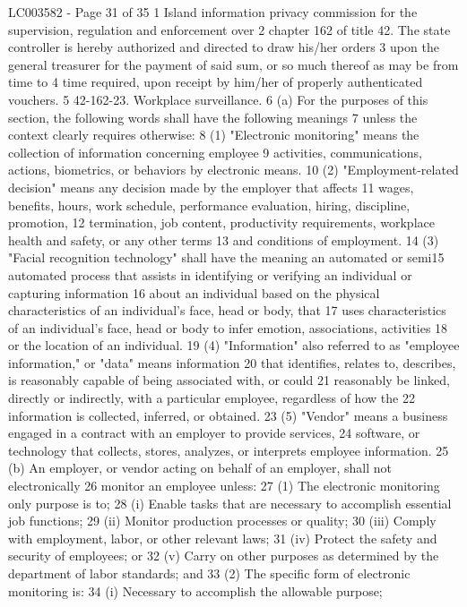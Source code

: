 LC003582 - Page 31 of 35
1 Island information privacy commission for the supervision, regulation and enforcement over
2 chapter 162 of title 42. The state controller is hereby authorized and directed to draw his/her orders
3 upon the general treasurer for the payment of said sum, or so much thereof as may be from time to
4 time required, upon receipt by him/her of properly authenticated vouchers.
5 42-162-23. Workplace surveillance.
6 (a) For the purposes of this section, the following words shall have the following meanings
7 unless the context clearly requires otherwise:
8 (1) "Electronic monitoring" means the collection of information concerning employee
9 activities, communications, actions, biometrics, or behaviors by electronic means.
10 (2) "Employment-related decision" means any decision made by the employer that affects
11 wages, benefits, hours, work schedule, performance evaluation, hiring, discipline, promotion,
12 termination, job content, productivity requirements, workplace health and safety, or any other terms
13 and conditions of employment.
14 (3) "Facial recognition technology" shall have the meaning an automated or semi15 automated process that assists in identifying or verifying an individual or capturing information
16 about an individual based on the physical characteristics of an individual's face, head or body, that
17 uses characteristics of an individual's face, head or body to infer emotion, associations, activities
18 or the location of an individual.
19 (4) "Information" also referred to as "employee information," or "data" means information
20 that identifies, relates to, describes, is reasonably capable of being associated with, or could
21 reasonably be linked, directly or indirectly, with a particular employee, regardless of how the
22 information is collected, inferred, or obtained.
23 (5) "Vendor" means a business engaged in a contract with an employer to provide services,
24 software, or technology that collects, stores, analyzes, or interprets employee information.
25 (b) An employer, or vendor acting on behalf of an employer, shall not electronically
26 monitor an employee unless:
27 (1) The electronic monitoring only purpose is to;
28 (i) Enable tasks that are necessary to accomplish essential job functions;
29 (ii) Monitor production processes or quality;
30 (iii) Comply with employment, labor, or other relevant laws;
31 (iv) Protect the safety and security of employees; or
32 (v) Carry on other purposes as determined by the department of labor standards; and
33 (2) The specific form of electronic monitoring is:
34 (i) Necessary to accomplish the allowable purpose;
